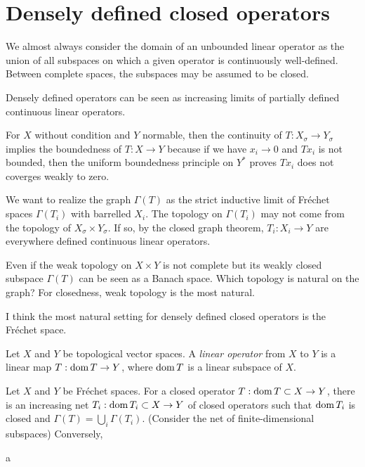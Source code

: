 \documentclass{../../large}
\begin{document}
\section{Densely defined closed operators}


We almost always consider the domain of an unbounded linear operator as the union of all subspaces on which a given operator is continuously well-defined.
Between complete spaces, the subspaces may be assumed to be closed.

Densely defined operators can be seen as increasing limits of partially defined continuous linear operators.


For $X$ without condition and $Y$ normable, then the continuity of $T:X_\sigma\to Y_\sigma$ implies the boundedness of $T:X\to Y$ because if we have $x_i\to0$ and $Tx_i$ is not bounded, then the uniform boundedness principle on $Y^*$ proves $Tx_i$ does not coverges weakly to zero.


We want to realize the graph $\Gamma(T)$ as the strict inductive limit of Fr\'echet spaces $\Gamma(T_i)$ with barrelled $X_i$.
The topology on $\Gamma(T_i)$ may not come from the topology of $X_\sigma\times Y_\sigma$.
If so, by the closed graph theorem, $T_i:X_i\to Y$ are everywhere defined continuous linear operators.


Even if the weak topology on $X\times Y$ is not complete but its weakly closed subspace $\Gamma(T)$ can be seen as a Banach space.
Which topology is natural on the graph?
For closedness, weak topology is the most natural.


I think the most natural setting for densely defined closed operators is the Fr\'echet space.

\begin{prb}
Let $X$ and $Y$ be topological vector spaces.
A \emph{linear operator} from $X$ to $Y$ is a linear map $T:\operatorname{dom} T\to Y$, where $\operatorname{dom} T$ is a linear subspace of $X$.

\end{prb}

\begin{prb}
Let $X$ and $Y$ be Fr\'echet spaces.
For a closed operator $T:\operatorname{dom} T\subset X\to Y$, there is an increasing net $T_i:\operatorname{dom} T_i\subset X\to Y$ of closed operators such that $\operatorname{dom} T_i$ is closed and $\Gamma(T)=\bigcup_i\Gamma(T_i)$. (Consider the net of finite-dimensional subspaces)
Conversely, 

\begin{parts}
\item a
\end{parts}
\end{prb}
\end{document}
